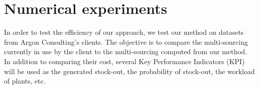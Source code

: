 \chapter{Numerical experiments}
\label{chap:multi-sourcing:numerical-experiments}


In order to test the efficiency of our approach, we test our method on datasets from Argon Consulting’s clients.
The objective is to compare the multi-sourcing currently in use by the client to the multi-sourcing computed from our method.
In addition to comparing their cost, several Key Performance Indicators (KPI) will be used as the generated stock-out, the probability of stock-out, the workload of plants, etc.












